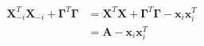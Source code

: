 \documentclass[10pt]{article}
\begin{document}
\begin{align*}\begin{split}
\boldsymbol X_{-i}^T \boldsymbol X_{-i} + \boldsymbol \Gamma^T \boldsymbol \Gamma &=
\boldsymbol X^T \boldsymbol X + \boldsymbol \Gamma^T \boldsymbol \Gamma -\boldsymbol x_i \boldsymbol x_i^T \\
&= \boldsymbol A -\boldsymbol x_i \boldsymbol x_i^T \\
\end{split}\end{align*}
\end{document}
